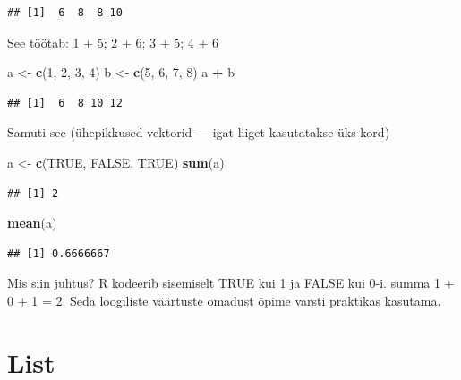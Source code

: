 \documentclass[]{book}
\newenvironment{Shaded}{\begin{snugshade}}{\end{snugshade}}
\newcommand{\KeywordTok}[1]{\textcolor[rgb]{0.13,0.29,0.53}{\textbf{#1}}}
\newcommand{\DecValTok}[1]{\textcolor[rgb]{0.00,0.00,0.81}{#1}}
\newcommand{\StringTok}[1]{\textcolor[rgb]{0.31,0.60,0.02}{#1}}
\newcommand{\OtherTok}[1]{\textcolor[rgb]{0.56,0.35,0.01}{#1}}
\newcommand{\OperatorTok}[1]{\textcolor[rgb]{0.81,0.36,0.00}{\textbf{#1}}}
\newcommand{\NormalTok}[1]{#1}
\begin{document}
\begin{verbatim}
## [1]  6  8  8 10
\end{verbatim}

See töötab: 1 + 5; 2 + 6; 3 + 5; 4 + 6

\begin{Shaded}
\begin{Highlighting}[]
\NormalTok{a <-}\StringTok{ }\KeywordTok{c}\NormalTok{(}\DecValTok{1}\NormalTok{, }\DecValTok{2}\NormalTok{, }\DecValTok{3}\NormalTok{, }\DecValTok{4}\NormalTok{)}
\NormalTok{b <-}\StringTok{ }\KeywordTok{c}\NormalTok{(}\DecValTok{5}\NormalTok{, }\DecValTok{6}\NormalTok{, }\DecValTok{7}\NormalTok{, }\DecValTok{8}\NormalTok{) }
\NormalTok{a }\OperatorTok{+}\StringTok{ }\NormalTok{b}
\end{Highlighting}
\end{Shaded}

\begin{verbatim}
## [1]  6  8 10 12
\end{verbatim}

Samuti see (ühepikkused vektorid --- igat liiget kasutatakse üks kord)

\begin{Shaded}
\begin{Highlighting}[]
\NormalTok{a <-}\StringTok{ }\KeywordTok{c}\NormalTok{(}\OtherTok{TRUE}\NormalTok{, }\OtherTok{FALSE}\NormalTok{, }\OtherTok{TRUE}\NormalTok{)}
\KeywordTok{sum}\NormalTok{(a)}
\end{Highlighting}
\end{Shaded}

\begin{verbatim}
## [1] 2
\end{verbatim}

\begin{Shaded}
\begin{Highlighting}[]
\KeywordTok{mean}\NormalTok{(a)}
\end{Highlighting}
\end{Shaded}

\begin{verbatim}
## [1] 0.6666667
\end{verbatim}

Mis siin juhtus? R kodeerib sisemiselt TRUE kui 1 ja FALSE kui 0-i.
summa 1 + 0 + 1 = 2. Seda loogiliste väärtuste omadust õpime varsti
praktikas kasutama.

\section{List}\label{list}
\end{document}

